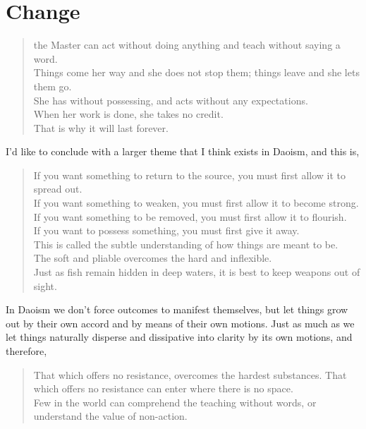 \section{Change}

\begin{verse}
the Master can act without doing anything and teach without saying a word.\\
Things come her way and she does not stop them; things leave and she lets them go.\\
She has without possessing, and acts without any expectations.\\
When her work is done, she takes no credit.\\
That is why it will last forever.\\
\end{verse}

I’d like to conclude with a larger theme that I think exists in Daoism, and this is,


\begin{verse}
If you want something to return to the source, you must first allow it to spread out.\\
If you want something to weaken, you must first allow it to become strong.\\
If you want something to be removed, you must first allow it to flourish.\\
If you want to possess something, you must first give it away.\\
This is called the subtle understanding of how things are meant to be.\\
The soft and pliable overcomes the hard and inflexible.\\
Just as fish remain hidden in deep waters, it is best to keep weapons out of sight.\\
\end{verse}

In Daoism we don’t force outcomes to manifest themselves, but let things grow out by their own accord and by means of their own motions. Just as much as we let things naturally disperse and dissipative into clarity by its own motions, and therefore,

\begin{verse}
That which offers no resistance, overcomes the hardest substances. That which offers no resistance can enter where there is no space.\\
Few in the world can comprehend the teaching without words, or understand the value of non-action.\\
\end{verse}





